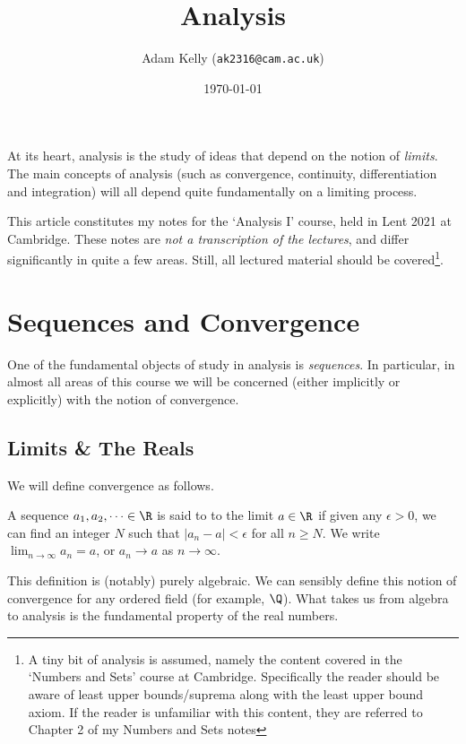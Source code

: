 \documentclass[a4paper]{scrartcl}
\title{Analysis}
\author{Adam Kelly (\texttt{ak2316@cam.ac.uk})}
\date{\today}
\begin{document}
\maketitle

At its heart, analysis is the study of ideas that depend on the notion of \emph{limits}.
The main concepts of analysis (such as convergence, continuity, differentiation and integration) will all depend quite fundamentally on a limiting process.

This article constitutes my notes for the `Analysis I' course, held in Lent 2021 at Cambridge. These notes are \emph{not a transcription of the lectures}, and differ significantly in quite a few areas. Still, all lectured material should be covered\footnote{A tiny bit of analysis is assumed, namely the content covered in the `Numbers and Sets' course at Cambridge. Specifically the reader should be aware of least upper bounds/suprema along with the least upper bound axiom. If the reader is unfamiliar with this content, they are referred to Chapter 2 of my Numbers and Sets notes}. 

\tableofcontents

\section{Sequences and Convergence} \label{sec:1.1}

One of the fundamental objects of study in analysis is \emph{sequences}. In particular, in almost all areas of this course we will be concerned (either implicitly or explicitly) with the notion of convergence.

\subsection{Limits \& The Reals}

We will define convergence as follows.

\begin{definition}[Convergence]
	A sequence $a_1, a_2, \dots \in \R$ is said to  to the limit $a \in \R$ if given any $\epsilon > 0$, we can find an integer $N$ such that $|a_n - a| < \epsilon$ for all $n \geq N$. We write $\displaystyle\lim_{n \to \infty}a_n = a$, or $a_n \rightarrow a$ as $n \rightarrow \infty$.
\end{definition}

This definition is (notably) purely algebraic. We can sensibly define this notion of convergence for any ordered field (for example, $\Q$). What takes us from algebra to analysis is the fundamental property of the real numbers.
\end{document}
